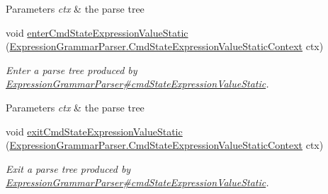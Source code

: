 \begin{DoxyCompactItemize}
\begin{DoxyCompactList}
\begin{DoxyParams}{Parameters}
{\em ctx} & the parse tree\\
\hline
\end{DoxyParams}
 \end{DoxyCompactList}\item 
void \hyperlink{classgov_1_1nasa_1_1jpf_1_1inspector_1_1server_1_1expression_1_1parser_1_1_expression_grammar_base_listener_a4188d9690104bdce1cce2ba8ecc421b7}{enter\+Cmd\+State\+Expression\+Value\+Static} (\hyperlink{classgov_1_1nasa_1_1jpf_1_1inspector_1_1server_1_1expression_1_1parser_1_1_expression_grammar_pa08e6165e66cacb4d3382a343315ee767}{Expression\+Grammar\+Parser.\+Cmd\+State\+Expression\+Value\+Static\+Context} ctx)
\begin{DoxyCompactList}\small\item\em Enter a parse tree produced by \hyperlink{classgov_1_1nasa_1_1jpf_1_1inspector_1_1server_1_1expression_1_1parser_1_1_expression_grammar_parser_abeaf7544d2fb53e23e913f8d829ba78e}{Expression\+Grammar\+Parser\#cmd\+State\+Expression\+Value\+Static}.


\begin{DoxyParams}{Parameters}
{\em ctx} & the parse tree\\
\hline
\end{DoxyParams}
 \end{DoxyCompactList}\item 
void \hyperlink{classgov_1_1nasa_1_1jpf_1_1inspector_1_1server_1_1expression_1_1parser_1_1_expression_grammar_base_listener_add26aa9c26ad4c9336ee184fd012df27}{exit\+Cmd\+State\+Expression\+Value\+Static} (\hyperlink{classgov_1_1nasa_1_1jpf_1_1inspector_1_1server_1_1expression_1_1parser_1_1_expression_grammar_pa08e6165e66cacb4d3382a343315ee767}{Expression\+Grammar\+Parser.\+Cmd\+State\+Expression\+Value\+Static\+Context} ctx)
\begin{DoxyCompactList}\small\item\em Exit a parse tree produced by \hyperlink{classgov_1_1nasa_1_1jpf_1_1inspector_1_1server_1_1expression_1_1parser_1_1_expression_grammar_parser_abeaf7544d2fb53e23e913f8d829ba78e}{Expression\+Grammar\+Parser\#cmd\+State\+Expression\+Value\+Static}.



\end{DoxyCompactList}
\end{DoxyCompactItemize}
